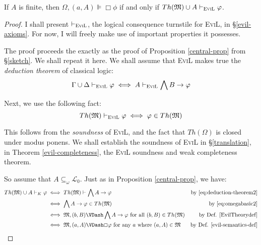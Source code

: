 \begin{theorem}\label{theorem-theorem}
  If $A$ is finite, then $\Omega, (a,A) \VDash \Box \phi$ if and only if $Th(\Omega) \cup A \vdash_{\text{\textsc{EviL}}} \phi$.
\end{theorem}
\begin{proof}
I shall present $\vdash_{\text{\textsc{EviL}}}$, the logical
consequence turnstile for \textsc{EviL}, in \S\ref{evil-axioms}.  For
now, I will freely make use of important properties it possesses.

  The proof proceeds the exactly as the proof of Proposition
  \ref{central-prop} from \S\ref{sketch}.  We shall repeat it here.
  We shall assume that \textsc{EviL} makes true the \emph{deduction theorem} of classical logic:
\begin{equation}
\Gamma \cup \Delta \vdash_{\text{\textsc{EviL}}} \phi 
   \iff A \vdash_{\text{\textsc{EviL}}} \bigwedge B \to \phi 
     \label{eq:deduction-theorem2}
\end{equation}

Next, we use the following fact:
\begin{equation}
Th(\Omega) \vdash_{\text{\textsc{EviL}}} \phi \iff \phi \in Th(\Omega) \label{eq:omegabasic2}
\end{equation}

This follows from the \emph{soundness} of \textsc{EviL}, and the fact
that $Th(\Omega)$ is closed under modus ponens.  We shall establish the
soundness of \textsc{EviL} in \S\ref{translation}, in Theorem
\ref{evil-completeness}, the \textsc{EviL} soundness and weak
completeness theorem.

So assume that $A \subseteq_\omega \mathcal{L}_0$.  Just as in
Proposition \ref{central-prop}, we have:
\begin{align*}
  Th(\Omega) \cup A \vdash_K \phi & \iff   Th(\Omega) \vdash \bigwedge A
  \to \phi 
   & \textup{by \eqref{eq:deduction-theorem2}} 
\\
 & \iff \bigwedge A \to \phi \in Th(\Omega) & \textup{by
   \eqref{eq:omegabasic2}} \\
 & \iff \Omega, (b,B) \VDash \bigwedge A \to \phi \textup{ for all
   $(b,B) \in Th(\Omega)$} & \textup{by Def. \ref{EvilTheorydef}} \\
 & \iff \Omega,(a,A) \VDash \Box \phi \textup{ for any $a$ where
   $(a,A) \in \Omega$} & \textup{by Def. \ref{evil-semantics-def}}
\end{align*}

\end{proof}


